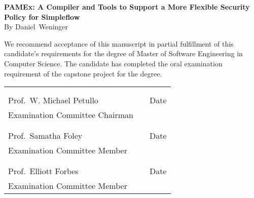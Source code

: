 \thispagestyle{empty}
\vspace*{0.3in}
\begin{center}
	\large{\textbf{PAMEx: A Compiler and Tools to Support a More Flexible Security Policy for Simpleflow}} \\ 
	\vspace{0.75in}
	\normalsize{By Daniel\ Weninger}
\end{center}

\vspace{0.5in}
\noindent We recommend acceptance of this manuscript in partial fulfillment of this candidate's requirements for the degree of Master of Software Engineering in Computer Science. The candidate has completed the oral examination requirement of the capstone project for the degree. \\

\noindent
\begin{tabularx}{\textwidth}{p{3in}Xp{2in}}
	\rule{0pt}{50pt} & & \\
	\hrulefill & & \hrulefill \\
	Prof.\ W. Michael Petullo & & Date \\
	Examination Committee Chairman & & \\
	\rule{0pt}{50pt} & & \\
	\hrulefill & & \hrulefill \\
	Prof.\ Samatha Foley & & Date \\
	Examination Committee Member & & \\
	\rule{0pt}{50pt} & & \\
	\hrulefill & & \hrulefill \\
	Prof.\ Elliott Forbes & & Date \\
	Examination Committee Member & & \\
\end{tabularx}


